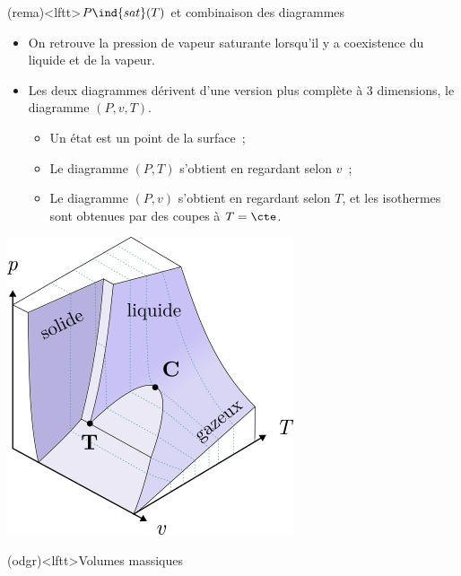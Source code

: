 \documentclass[../../main/main.tex]{subfiles}
\begin{document}
\begin{tcb}[sidebyside, righthand ratio=.4](rema)<lftt>{$P\ind{sat}(T)$ et combinaison des diagrammes}
	\begin{itemize}
		\item On retrouve la pression de vapeur saturante lorsqu'il y a coexistence
		      du liquide et de la vapeur.
		\item Les deux diagrammes dérivent d'une version plus complète à 3
		      dimensions, le diagramme $(P,v,T)$.
		      \begin{itemize}
			      \item Un état est un point de la surface~;
			      \item Le diagramme $(P,T)$ s'obtient en regardant selon $v$~;
			      \item Le diagramme $(P,v)$ s'obtient en regardant selon $T$, et les
			            isothermes sont obtenues par des coupes à $T = \cte$.
		      \end{itemize}
	\end{itemize}
	\tcblower
	\begin{center}
		\includegraphics[width=1\linewidth]{Pvt}
	\end{center}
\end{tcb}
\begin{tcb*}(odgr)<lftt>{Volumes massiques}
	\vspace{-15pt}
\end{tcb*}
\end{document}
